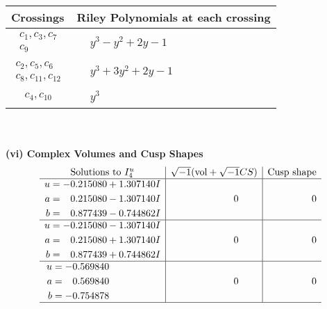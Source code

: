 \documentclass[1p]{elsarticle_modified}
\theoremstyle{definition}
\newcommand{\I}{\sqrt{-1}}
\begin{document}
\begin{tabular}{m{50pt}|m{274pt}}
Crossings & \hspace{64pt}Riley Polynomials at each crossing \\
\hline $$\begin{aligned}c_{1},c_{3},c_{7}\\c_{9}\end{aligned}$$&$\begin{aligned}
&y^3- y^2+2 y-1
\end{aligned}$\\
\hline $$\begin{aligned}c_{2},c_{5},c_{6}\\c_{8},c_{11},c_{12}\end{aligned}$$&$\begin{aligned}
&y^3+3 y^2+2 y-1
\end{aligned}$\\
\hline $$\begin{aligned}c_{4},c_{10}\end{aligned}$$&$\begin{aligned}
&y^3
\end{aligned}$\\
\hline
\end{tabular}\\~\\
\newpage\flushleft \textbf{(vi) Complex Volumes and Cusp Shapes}
$$\begin{array}{c|c|c}  
\text{Solutions to }I^u_{4}& \I (\text{vol} + \sqrt{-1}CS) & \text{Cusp shape}\\
 \hline 
\begin{aligned}
u &= -0.215080 + 1.307140 I \\
a &= \phantom{-}0.215080 - 1.307140 I \\
b &= \phantom{-}0.877439 - 0.744862 I\end{aligned}
 & \phantom{-0.000000 } 0 & \phantom{-0.000000 } 0 \\ \hline\begin{aligned}
u &= -0.215080 - 1.307140 I \\
a &= \phantom{-}0.215080 + 1.307140 I \\
b &= \phantom{-}0.877439 + 0.744862 I\end{aligned}
 & \phantom{-0.000000 } 0 & \phantom{-0.000000 } 0 \\ \hline\begin{aligned}
u &= -0.569840\phantom{ +0.000000I} \\
a &= \phantom{-}0.569840\phantom{ +0.000000I} \\
b &= -0.754878\phantom{ +0.000000I}\end{aligned}
 & \phantom{-0.000000 } 0 & \phantom{-0.000000 } 0\\
 \hline 
 \end{array}$$\newpage
\end{document}
